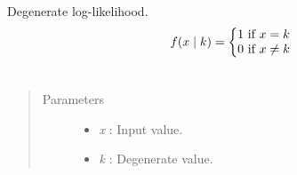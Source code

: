 \documentclass[letterpaper,10pt,english]{sphinxmanual}
\begin{document}
\begin{fulllineitems}
\label{distributions:pymc.distributions.degenerate_like}
Degenerate log-likelihood.
\begin{gather}
\begin{split}f(x \mid k) = \left\{ \begin{matrix} 1 \text{ if } x = k \\ 0 \text{ if } x \ne k\end{matrix} \right.\end{split}\notag\\\begin{split}\end{split}\notag
\end{gather}\begin{quote}\begin{description}
\item[{Parameters }] \leavevmode\begin{itemize}
\item {} 
\emph{x} : Input value.

\item {} 
\emph{k} : Degenerate value.

\end{itemize}

\end{description}\end{quote}

\end{fulllineitems}

\end{document}
